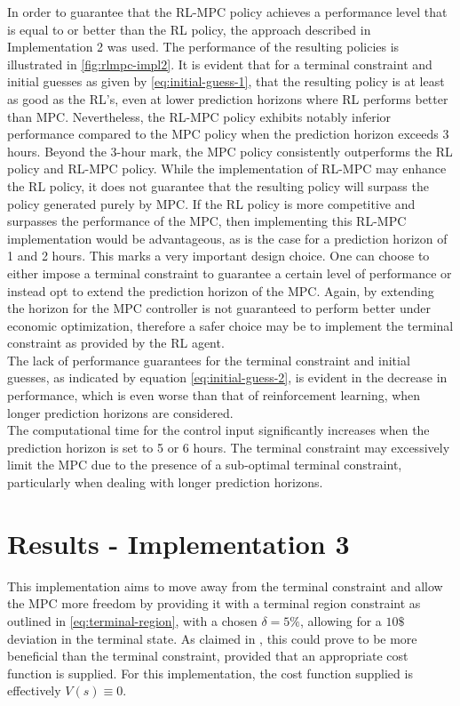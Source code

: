 In order to guarantee that the RL-MPC policy achieves a performance level that is equal to or better than the RL policy, the approach described in Implementation 2 was used.  The performance of the resulting policies is illustrated in \autoref{fig:rlmpc-impl2}. It is evident that for a terminal constraint and initial guesses as given by \autoref{eq:initial-guess-1}, that the resulting policy is at least as good as the RL's, even at lower prediction horizons where RL performs better than MPC. Nevertheless, the RL-MPC policy exhibits notably inferior performance compared to the MPC policy when the prediction horizon exceeds 3 hours. Beyond the 3-hour mark, the MPC policy consistently outperforms the RL policy and RL-MPC policy.  While the implementation of RL-MPC may enhance the RL policy, it does not guarantee that the resulting policy will surpass the policy generated purely by MPC. If the RL policy is more competitive and surpasses the performance of the MPC, then implementing this RL-MPC implementation would be advantageous, as is the case for a prediction horizon of 1 and 2 hours. This marks a very important design choice. One can choose to either impose a terminal constraint to guarantee a certain level of performance or instead opt to extend the prediction horizon of the MPC. Again, by extending the horizon for the MPC controller is not guaranteed to perform better under economic optimization, therefore a safer choice may be to implement the terminal constraint as provided by the RL agent.
\\
The lack of performance guarantees for the terminal constraint and initial guesses, as indicated by equation \autoref{eq:initial-guess-2}, is evident in the decrease in performance, which is even worse than that of reinforcement learning, when longer prediction horizons are considered.\\

The computational time for the control input significantly increases when the prediction horizon is set to 5 or 6 hours. The terminal constraint may excessively limit the MPC due to the presence of a sub-optimal terminal constraint, particularly when dealing with longer prediction horizons.

\section{Results - Implementation 3}
This implementation aims to move away from the terminal constraint and allow the MPC more freedom by providing it with a terminal region constraint as outlined in \autoref{eq:terminal-region}, with a chosen $\delta = 5\%$, allowing for a $10\$$ deviation in the terminal state. As claimed in \cite{amritEconomicOptimizationUsing2011}, this could prove to be more beneficial than the terminal constraint, provided that an appropriate cost function is supplied. For this implementation, the cost function supplied is effectively $V(s) \equiv 0$. 



